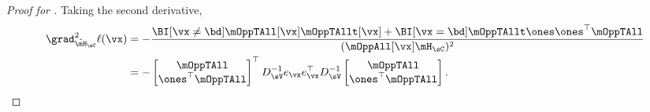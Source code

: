 \begin{proof}[Proof for ]
Taking the second derivative,
\begin{align}
  \grad^2_{\tilde \mH_\sC} \ell(\vx)
  &= -\frac{\BI[\vx \neq \bd] \mOppTAll[\vx] \mOppTAllt[\vx] + \BI[\vx = \bd] \mOppTAllt \ones \ones^\top \mOppTAll}{(\mOppAll[\vx] \mH_\sC)^2} \nonumber \\
  &= - 
  \begin{bmatrix}
    \mOppTAll \\
    \ones^\top \mOppTAll
  \end{bmatrix}^\top
    D_{\sV}^{-1} e_\vx e_\vx^\top D_{\sV}^{-1} 
  \begin{bmatrix}
    \mOppTAll \\
    \ones^\top \mOppTAll
  \end{bmatrix}. \label{eqn:lhood-hess}%
\end{align}


\end{proof}
